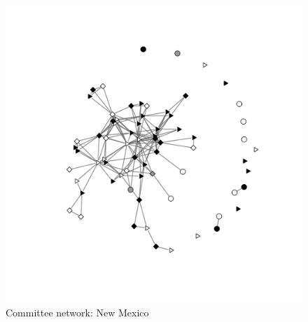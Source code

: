 \documentclass{beamer}
\begin{document}
\begin{frame}
\begin{columns}[c]
\begin{figure}
\centering
\includegraphics[scale=0.35]{Coppock_nm_committee_net.pdf}
\caption {Committee network: New Mexico}
\end{figure}

\end{columns}
\end{frame}
\end{document}
